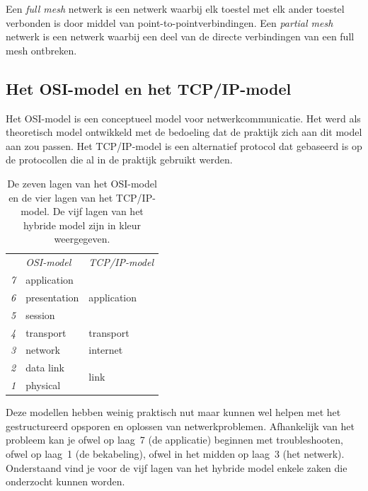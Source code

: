 Een \emph{full mesh} netwerk is een netwerk waarbij elk toestel met elk ander toestel verbonden is door middel van point-to-pointverbindingen.
Een \emph{partial mesh} netwerk is een netwerk waarbij een deel van de directe verbindingen van een full mesh ontbreken.

\subsection{Het OSI-model en het TCP/IP-model}

Het OSI-model is een conceptueel model voor netwerkcommunicatie.
Het werd als theoretisch model ontwikkeld met de bedoeling dat de praktijk zich aan dit model aan zou passen.
Het TCP/IP-model is een alternatief protocol dat gebaseerd is op de protocollen die al in de praktijk gebruikt werden.

\begin{table}[htp]
   \centering
   \begin{tabular}{rll}
     & \textit{OSI-model} & \textit{TCP/IP-model} \\[1ex]
   \textit{7} & application & \multirow{3}{*}{\textcolor{spot1}{application}} \\
   \textit{6} & presentation & \\
   \textit{5} & session & \\[1ex]
   \textit{4} & \textcolor{spot1}{transport} & transport \\[1ex]
   \textit{3} & \textcolor{spot1}{network} & internet \\[1ex]
   \textit{2} & \textcolor{spot1}{data link} & \multirow{2}{*}{link} \\
   \textit{1} & \textcolor{spot1}{physical} & \\
   \end{tabular}
   \caption{De zeven lagen van het OSI-model en de vier lagen van het TCP/IP-model.
   De vijf lagen van het hybride model zijn in kleur weergegeven.}
   \label{tab:osi-model}
\end{table}

Deze modellen hebben weinig praktisch nut maar kunnen wel helpen met het gestructureerd opsporen en oplossen van netwerkproblemen.
Afhankelijk van het probleem kan je ofwel op laag~7 (de applicatie) beginnen met troubleshooten, ofwel op laag~1 (de bekabeling), ofwel in het midden op laag~3 (het netwerk).
Onderstaand vind je voor de vijf lagen van het hybride model enkele zaken die onderzocht kunnen worden.

